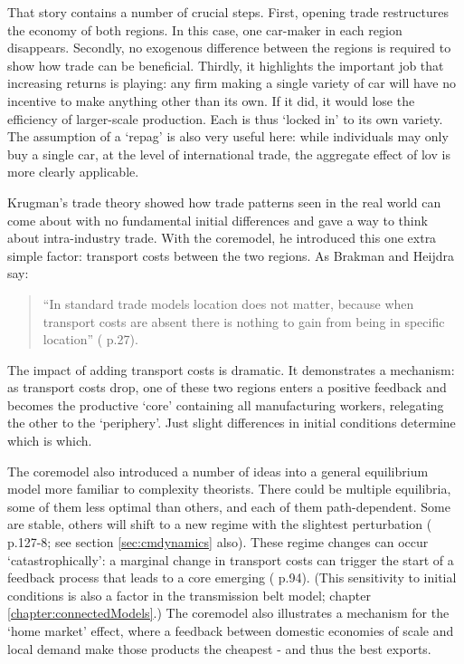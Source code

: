 That story contains a number of crucial steps. First, opening trade restructures the economy of both regions. In this case, one car-maker in each region disappears. Secondly, no exogenous difference between the regions is required to show how trade can be beneficial. Thirdly, it highlights the important job that increasing returns is playing: any firm making a single variety of car will have no incentive to make anything other than its own. If it did, it would lose the efficiency of larger-scale production. Each is thus `locked in' to its own variety. The assumption of a `\gls{repag}' is also very useful here: while individuals may only buy a single car, at the level of international trade, the aggregate effect of \gls{lov} is more clearly applicable. 

Krugman's trade theory showed how trade patterns seen in the real world can come about with no fundamental initial differences and gave a way to think about intra-industry trade. With the \gls{coremodel}, he introduced this one extra simple factor: transport costs between the two regions. As Brakman and Heijdra say:

\begin{quote}
``In standard trade models location does not matter, because when transport costs are absent there is nothing to gain from being in specific location'' (\citealt{brakman_monopolistic_2001} p.27). 
\end{quote}

The impact of adding transport costs is dramatic. It demonstrates a mechanism: as transport costs drop, one of these two regions enters a positive feedback and becomes the productive `core' containing all manufacturing workers, relegating the other to the `periphery'. Just slight differences in initial conditions determine which is which. 

The \gls{coremodel} also introduced a number of ideas into a general equilibrium model more familiar to complexity theorists. There could be multiple equilibria, some of them less optimal than others, and each of them path-dependent. Some are stable, others will shift to a new regime with the slightest perturbation (\citealt{brakman_new_2009} p.127-8; see section \ref{sec:cmdynamics} also). These regime changes can occur `catastrophically': a marginal change in transport costs can trigger the start of a feedback process that leads to a core emerging (\citealt{fujita_spatial_2001} p.94). (This sensitivity to initial conditions is also a factor in the transmission belt model; chapter \ref{chapter:connectedModels}.) The \gls{coremodel} also illustrates a mechanism for the `home market' effect, where a feedback between domestic economies of scale and local demand make those products the cheapest - and thus the best exports.


